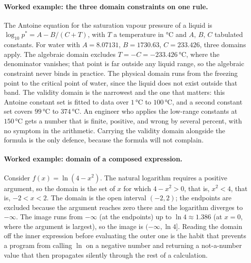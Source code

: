 \paragraph{Worked example: the three domain constraints on one rule.}
The Antoine equation for the saturation vapour pressure of a liquid
is $\log_{10} p^{*} = A - B/(C + T)$, with $T$ a temperature in
$\si{\degreeCelsius}$ and $A$, $B$, $C$ tabulated constants. For
water with $A = 8.07131$, $B = 1730.63$, $C = 233.426$, three
domains apply. The algebraic domain excludes $T = -C =
-233.426\,\si{\degreeCelsius}$, where the denominator vanishes; that
point is far outside any liquid range, so the algebraic constraint
never binds in practice. The physical domain runs from the freezing
point to the critical point of water, since the liquid does not exist
outside that band. The validity domain is the narrowest and the one
that matters: this Antoine constant set is fitted to data over
$1\,\si{\degreeCelsius}$ to $100\,\si{\degreeCelsius}$, and a second
constant set covers $99\,\si{\degreeCelsius}$ to
$374\,\si{\degreeCelsius}$. An engineer who applies the low-range
constants at $150\,\si{\degreeCelsius}$ gets a number that is finite,
positive, and wrong by several percent, with no symptom in the
arithmetic. Carrying the validity domain alongside the formula is the
only defence, because the formula will not complain.

\paragraph{Worked example: domain of a composed expression.}
Consider $f(x) = \ln(4 - x^{2})$. The natural logarithm requires a
positive argument, so the domain is the set of $x$ for which
$4 - x^{2} > 0$, that is, $x^{2} < 4$, that is, $-2 < x < 2$. The
domain is the open interval $(-2, 2)$; the endpoints are excluded
because the argument reaches zero there and the logarithm diverges to
$-\infty$. The image runs from $-\infty$ (at the endpoints) up to
$\ln 4 \approx 1.386$ (at $x = 0$, where the argument is largest), so
the image is $(-\infty, \ln 4]$. Reading the domain off the inner
expression before evaluating the outer one is the habit that prevents
a program from calling $\ln$ on a negative number and returning a
not-a-number value that then propagates silently through the rest of
a calculation.

